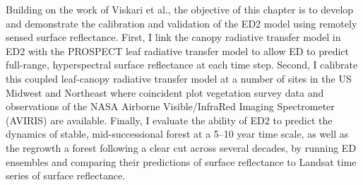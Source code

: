 Building on the work of Viskari et al., the objective of this chapter is to develop and demonstrate the calibration and validation of the ED2 model using remotely sensed surface reflectance.
First, I link the canopy radiative transfer model in ED2 with the PROSPECT leaf radiative transfer model to allow ED to predict full-range, hyperspectral surface reflectance at each time step.
Second, I calibrate this coupled leaf-canopy radiative transfer model at a number of sites in the US Midwest and Northeast where coincident plot vegetation survey data and observations of the NASA Airborne Visible/InfraRed Imaging Spectrometer (AVIRIS) are available.
Finally, I evaluate the ability of ED2 to predict the dynamics of stable, mid-successional forest at a 5--10 year time scale, as well as the regrowth a forest following a clear cut across several decades, by running ED ensembles and comparing their predictions of surface reflectance to Landsat time series of surface reflectance.
